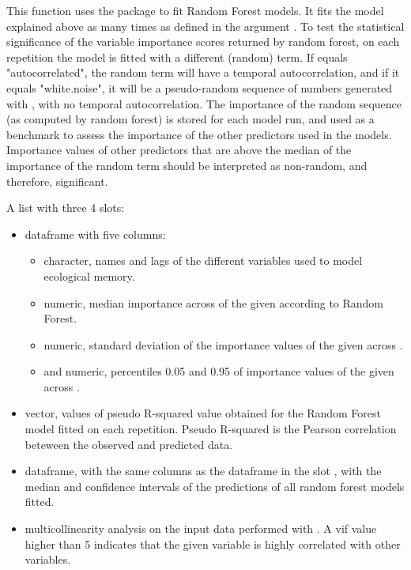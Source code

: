 \documentclass[letterpaper]{book}
\begin{document}
%
\begin{Details}\relax
This function uses the  package to fit Random Forest models. It fits the model explained above as many times as defined in the argument . To test the statistical significance of the variable importance scores returned by random forest, on each repetition the model is fitted with a different  (random) term. If  equals "autocorrelated", the random term will have a temporal autocorrelation, and if it equals "white.noise", it will be a pseudo-random sequence of numbers generated with , with no temporal autocorrelation. The importance of the random sequence (as computed by random forest) is stored for each model run, and used as a benchmark to assess the importance of the other predictors used in the models. Importance values of other predictors that are above the median of the importance of the random term should be interpreted as non-random, and therefore, significant.
\end{Details}
%
\begin{Value}
A list with three 4 slots:
\begin{itemize}

\item {} dataframe with five columns:
\begin{itemize}

\item {} character, names and lags of the different variables used to model ecological memory.
\item {} numeric, median importance across  of the given  according to Random Forest.
\item {} numeric, standard deviation of the importance values of the given  across .
\item {} and  numeric, percentiles 0.05 and 0.95 of importance values of the given  across .

\end{itemize}

\item {} vector, values of pseudo R-squared value obtained for the Random Forest model fitted on each repetition. Pseudo R-squared is the Pearson correlation beteween the observed and predicted data.
\item {} dataframe, with the same columns as the dataframe in the slot , with the median and confidence intervals of the predictions of all random forest models fitted.
\item {} multicollinearity analysis on the input data performed with . A vif value higher than 5 indicates that the given variable is highly correlated with other variables.

\end{itemize}

\end{Value}
\end{document}
